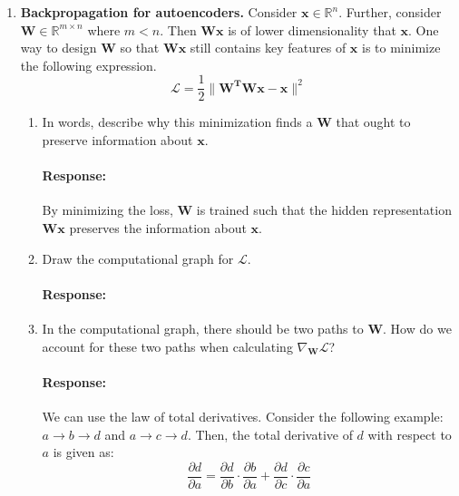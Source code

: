 \documentclass{article}
\newcommand{\R}{\mathbb{R}}
\newcommand{\T}{\bf{T}}
\newcommand{\x}{\bf{x}}
\newcommand{\W}{\bf{W}}
\newcommand{\pd}[2]{\frac{\partial{#1}}{\partial{#2}}}
\newenvironment{response}{\begin{responseframe}\vspace{-10pt}\paragraph{Response:}}{\end{responseframe}}
\renewcommand{\bf}[1]{\textbf{{#1}}}
\begin{document}
\begin{enumerate}
    \item \bf{Backpropagation for autoencoders.} Consider $\x \in \R^n$. Further, consider
        $\W \in \R^{m \times n}$ where $m < n$. Then $\W \x$ is of lower dimensionality that $\x$.
        One way to design $\W$ so that $\W \x$ still contains key features of $\x$ is to minimize
        the following expression.
        \[ \mathcal{L} = \frac{1}{2} \| \W^{\T} \W \x - \x \|^2 \]
        \begin{enumerate}
            \item In words, describe why this minimization finds a $\W$ that ought to preserve
                information about $\x$.
                \begin{response}
                    By minimizing the loss, $\W$ is trained such that the hidden representation
                    $\W \x$ preserves the information about $\x$.
                \end{response}
            \item Draw the computational graph for $\mathcal{L}$.
                \begin{response}
                    \hfil
                    \vspace{10em}

                \end{response}
            \item In the computational graph, there should be two paths to $\W$. How do we account
                for these two paths when calculating $\nabla_{\W} \mathcal{L}$?
                \begin{response}
                    We can use the law of total derivatives. Consider the following example:
                    $a \to b \to d$ and $a \to c \to d$. Then, the total derivative of $d$ with
                    respect to $a$ is given as:
                    \[ \pd{d}{a} = \pd{d}{b} \cdot \pd{b}{a} + \pd{d}{c} \cdot \pd{c}{a} \]


\end{response}
\end{enumerate}
\end{enumerate}
\end{document}
